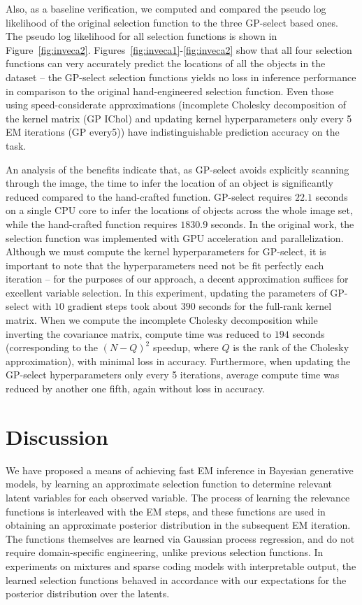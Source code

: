 \documentclass[12pt]{article}
\begin{document}
%
Also, as a baseline verification, 
we computed and compared the pseudo log likelihood \citep{DaiEtAl2013} of the original selection function to the three GP-select based ones.
The pseudo log likelihood for all selection functions is shown in Figure~\ref{fig:inveca2}.
Figures~\ref{fig:inveca1}-\ref{fig:inveca2} show that all four selection functions can very accurately predict the locations of all the objects in the dataset -- 
the GP-select selection functions yields no loss in inference performance in comparison to the original hand-engineered selection function. 
Even those using speed-considerate approximations (incomplete Cholesky decomposition of the kernel matrix (GP IChol) and updating kernel hyperparameters only every 5 EM iterations (GP every5)) have indistinguishable prediction accuracy on the task.


An analysis of the benefits indicate that, as GP-select avoids explicitly scanning through the image, the time to infer the location of an object is significantly reduced compared to the hand-crafted function. GP-select requires $22.1$ seconds on a single CPU core to infer the locations of objects across the whole image set, while the hand-crafted function requires $1830.9$ seconds. In the original work, the selection function was implemented with GPU acceleration and parallelization. 
Although we must compute the kernel hyperparameters for GP-select, 
it is important to note that the hyperparameters need not be fit perfectly each iteration -- for the purposes of our approach, a decent approximation suffices for excellent variable selection. 
 In this experiment, updating the parameters of GP-select with $10$ gradient steps took about $390$ seconds for the full-rank kernel matrix. 
When we compute the incomplete Cholesky decomposition while inverting the covariance matrix, compute time was reduced to $194$ seconds (corresponding to the $(N-Q)^2$ speedup, where $Q$ is the rank of the Cholesky approximation), with minimal loss in accuracy.
Furthermore, when updating the GP-select hyperparameters only every 5 iterations, average compute time was reduced by another one fifth, again without loss in accuracy.

\section{Discussion}
\label{disc}
We have proposed a means of achieving fast EM inference in Bayesian generative models, by
learning an approximate selection function to determine relevant latent variables
for each observed variable. The process of learning the relevance functions
is interleaved with the EM steps, and these functions
are used in obtaining an approximate posterior distribution in the subsequent EM iteration.
The functions themselves are learned via Gaussian process regression,
and do not require domain-specific engineering, unlike previous selection functions.
In experiments on mixtures and sparse coding models with interpretable output,
the learned selection functions behaved in accordance with our expectations for the posterior
distribution over the latents.  
\end{document}
